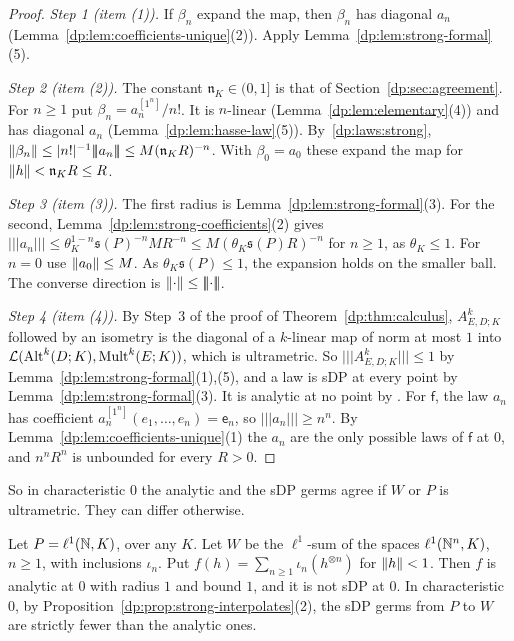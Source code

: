 \begin{proof}
\emph{Step 1 (item (1)).} If $\beta_n$ expand the map, then $\beta_n$ has diagonal $a_n$ (Lemma~\ref{dp:lem:coefficients-unique}(2)). Apply Lemma~\ref{dp:lem:strong-formal}(5).

\emph{Step 2 (item (2)).} The constant $\mathfrak n_K\in(0,1]$ is that of Section~\ref{dp:sec:agreement}. For $n\ge1$ put $\beta_n=a_n^{[1^n]}/n!$. It is $n$\nobreakdash-linear (Lemma~\ref{dp:lem:elementary}(4)) and has diagonal $a_n$ (Lemma~\ref{dp:lem:hasse-law}(5)). By~\eqref{dp:laws:strong}, $\lVert \beta_n\rVert\le\lvert n!\rvert^{-1}\lvert\!\lvert\!\lvert a_n\rvert\!\rvert\!\rvert\le M(\mathfrak n_KR)^{-n}$. With $\beta_0=a_0$ these expand the map for $\lVert h\rVert<\mathfrak n_KR\le R$.

\emph{Step 3 (item (3)).} The first radius is Lemma~\ref{dp:lem:strong-formal}(3). For the second, Lemma~\ref{dp:lem:strong-coefficients}(2) gives $\lvert\!\lvert\!\lvert a_n\rvert\!\rvert\!\rvert\le\theta_K^{1-n}\mathfrak s(P)^{-n}MR^{-n}\le M(\theta_K\mathfrak s(P)R)^{-n}$ for $n\ge1$, as $\theta_K\le1$. For $n=0$ use $\lVert a_0\rVert\le M$. As $\theta_K\mathfrak s(P)\le1$, the expansion holds on the smaller ball. The converse direction is $\lVert \cdot\rVert\le\lvert\!\lvert\!\lvert \cdot\rvert\!\rvert\!\rvert$.

\emph{Step 4 (item (4)).} By Step~3 of the proof of Theorem~\ref{dp:thm:calculus}, $A^k_{E,D;K}$ followed by an isometry is the diagonal of a $k$\nobreakdash-linear map of norm at most $1$ into $\mathcal L(\operatorname{Alt}^k(D;K),\operatorname{Mult}^k(E;K))$, which is ultrametric. So $\lvert\!\lvert\!\lvert A^k_{E,D;K}\rvert\!\rvert\!\rvert\le1$ by Lemma~\ref{dp:lem:strong-formal}(1),(5), and a law is sDP at every point by Lemma~\ref{dp:lem:strong-formal}(3). It is analytic at no point by \cite[Theorem~7.2(2)]{I}. For $\mathsf f$, the law $a_n$ has coefficient $a_n^{[1^n]}(e_1,\dots,e_n)=\mathsf e_n$, so $\lvert\!\lvert\!\lvert a_n\rvert\!\rvert\!\rvert\ge n^n$. By Lemma~\ref{dp:lem:coefficients-unique}(1) the $a_n$ are the only possible laws of $\mathsf f$ at $0$, and $n^nR^n$ is unbounded for every $R>0$.
\end{proof}

So in characteristic $0$ the analytic and the sDP germs agree if $W$ or $P$ is ultrametric. They can differ otherwise.

\begin{example}\label{dp:ex:an-not-sdp}
Let $P=\ell^1(\mathbb N,K)$, over any $K$. Let $W$ be the $\ell^1$-sum of the spaces $\ell^1(\mathbb N^n,K)$, $n\ge1$, with inclusions $\iota_n$. Put $f(h)=\sum_{n\ge1}\iota_n(h^{\otimes n})$ for $\lVert h\rVert<1$. Then $f$ is analytic at $0$ with radius $1$ and bound $1$, and it is not sDP at $0$. In characteristic $0$, by Proposition~\ref{dp:prop:strong-interpolates}(2), the sDP germs from $P$ to $W$ are strictly fewer than the analytic ones.
\end{example}

